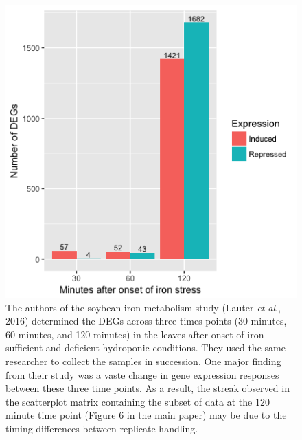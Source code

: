 \documentclass{article}
\begin{document}
  \clearpage
  \null
  \begin{figure}[!t]
  \centerline{\includegraphics[width=0.7\columnwidth]{../MakeFigures/soybeanDEG.png}}
  \caption{The authors of the soybean iron metabolism study (Lauter \textit{et al}., 2016) determined the DEGs across three times points (30 minutes, 60 minutes, and 120 minutes) in the leaves after onset of iron sufficient and deficient hydroponic conditions. They used the same researcher to collect the samples in succession. One major finding from their study was a vaste change in gene expression responses between these three time points. As a result, the streak observed in the scatterplot matrix containing the subset of data at the 120 minute time point (Figure 6 in the main paper) may be due to the timing differences between replicate handling.
  \label{soybeanDEG}}
  \end{figure}
  
\end{document}
